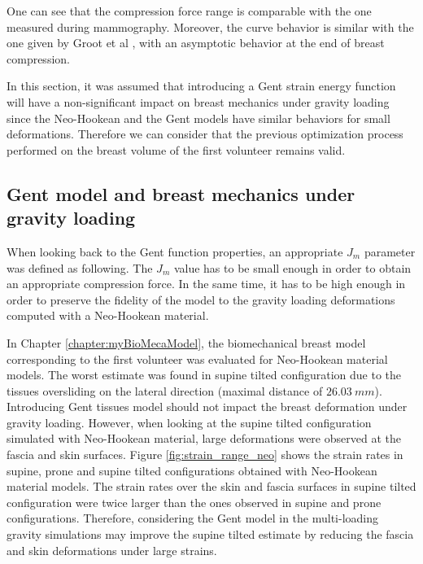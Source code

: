  One can see that the compression force range is comparable with the one measured during mammography. Moreover, the curve behavior is similar with the one given by Groot et al \citep{de_pain_2015}, with an asymptotic behavior at the end of breast compression.
 
 In this section, it was assumed that introducing a Gent strain energy function will have a non-significant impact on breast mechanics under gravity loading since the Neo-Hookean and the Gent models have similar behaviors for small deformations. Therefore we can consider that the previous optimization process performed on the breast volume of the first volunteer remains valid. 
 
 \subsection{ Gent model and breast mechanics under gravity loading}
 
 When looking back to the Gent function properties, an appropriate  $J_m$ parameter was defined as following. The $J_m$ value has to be small enough in order to obtain an appropriate compression force. In the same time, it has to be high enough in order to preserve the fidelity of the model to the gravity loading deformations computed with a Neo-Hookean material.
 
 In Chapter \ref{chapter:myBioMecaModel}, the biomechanical breast model corresponding to the first volunteer was evaluated for Neo-Hookean material models. The worst estimate was found in supine tilted configuration due to the tissues oversliding on the lateral direction (maximal distance of $26.03 \ mm$). Introducing Gent tissues model should not impact the breast deformation under gravity loading. However, when looking at the supine tilted configuration simulated with Neo-Hookean material, large deformations were observed at the fascia and skin surfaces. Figure \ref{fig:strain_range_neo} shows the strain rates in supine, prone and supine tilted configurations obtained with Neo-Hookean material models. The strain rates over the skin and fascia surfaces in supine tilted configuration were twice larger than the ones observed in supine and prone configurations. Therefore, considering the Gent model in the multi-loading gravity simulations may improve the supine tilted estimate by reducing the fascia and skin deformations under large strains. 


